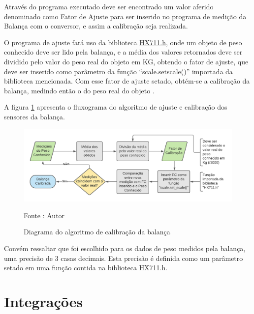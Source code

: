 \par Através do programa executado deve ser encontrado um valor aferido  denominado como Fator de Ajuste para  ser inserido no programa de medição da Balança com o conversor, e assim a calibração seja realizada.

\par O programa de ajuste fará uso da biblioteca \href{https://github.com/bogde/HX711}{HX711.h}, onde um objeto de peso conhecido deve ser lido pela balança, e a média dos valores retornados deve ser dividido pelo valor do peso real do objeto em KG, obtendo o fator de ajuste, que deve ser inserido como parâmetro da função “scale.set\textunderscore scale()” importada da biblioteca mencionada. Com esse fator de ajuste setado, obtém-se a calibração da balança, medindo então o do peso real do objeto \cite{CALIBRACAO_tutorial}.

\par A figura \ref{fig:Calibracao_balanca} apresenta o fluxograma do algoritmo de ajuste e calibração dos sensores da balança.

\begin{figure}[H]
  \centering
  \includegraphics[scale=0.6]{figuras/Algoritmo de Calibração da Balança.png}
  \caption{Diagrama do algoritmo de calibração da balança } 
  {\footnotesize Fonte : Autor } 
  \label{fig:Calibracao_balanca}
\end{figure}

Convém ressaltar que foi escolhido para os dados de peso medidos pela balança, uma precisão de 3 casas decimais. Esta precisão é definida como um parâmetro setado em uma função contida na biblioteca \href{https://github.com/bogde/HX711}{HX711.h}.

\section{Integrações}

